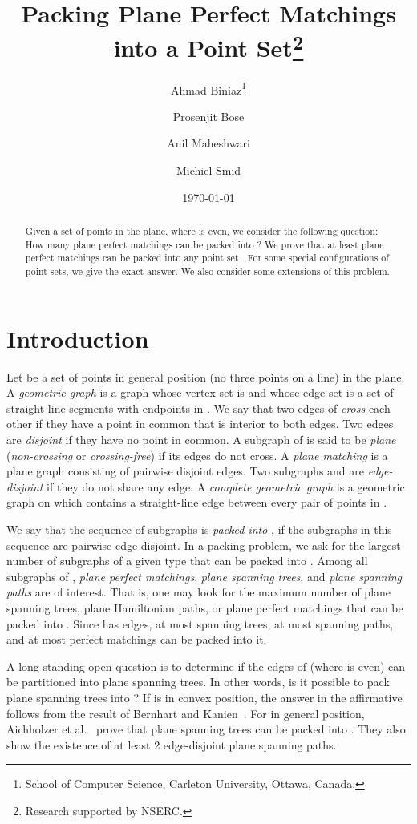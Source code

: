 \documentclass[11pt,a4paper]{article}
\title{Packing Plane Perfect Matchings into a Point Set\thanks{Research supported by NSERC.}}
\author{
Ahmad Biniaz\thanks{School of Computer Science, Carleton University, 
                    Ottawa, Canada.}
\and 
Prosenjit Bose\footnotemark[2]
\and
Anil Maheshwari\footnotemark[2]
\and 
Michiel Smid\footnotemark[2]
}\date{\today}
\begin{document}
\maketitle

\begin{abstract}
Given a set  of  points in the plane, where  is even, we consider the following question: How many plane perfect matchings can be packed into ? We prove that at least  plane perfect matchings can be packed into any point set . For some special configurations of point sets, we give the exact answer. We also consider some extensions of this problem.
\end{abstract}
\section{Introduction}
\label{introduction-section}
Let  be a set of  points in general position (no three points on a line) in the plane. A {\em geometric graph}  is a graph whose vertex set is  and whose edge set  is a set of straight-line segments with endpoints in . We say that two edges of  {\em cross} each other if they have a point in common that is interior to both edges. Two edges are {\em disjoint} if they have no point in common. A subgraph  of  is said to be {\em plane} ({\em non-crossing} or {\em crossing-free}) if its edges do not cross. A {\em plane matching} is a plane graph consisting of pairwise disjoint edges. Two subgraphs  and  are {\em edge-disjoint} if they do not share any edge. A {\em complete geometric graph}  is a geometric graph on  which contains a straight-line edge between every pair of points in . 

We say that the sequence  of subgraphs is {\em packed into} , if the subgraphs in this sequence are pairwise edge-disjoint. In a packing problem, we ask for the largest number of subgraphs of a given type that can be packed into . Among all subgraphs of , {\em plane perfect matchings}, {\em plane spanning trees}, and {\em plane spanning paths} are of interest. That is, one may look for the maximum number of plane spanning trees, plane Hamiltonian paths, or plane perfect matchings that can be packed into . Since  has  edges, at most  spanning trees, at most  spanning paths, and at most  perfect matchings can be packed into it. 

A long-standing open question is to determine if the edges of  (where  is even) can be partitioned into  plane spanning trees. In other words, is it possible to pack  plane spanning trees into ? If  is in convex position, the answer in the affirmative follows from the result of Bernhart and Kanien~\cite{Bernhart1979}. For  in general position, Aichholzer et al.~\cite{Aichholzer2014} prove that  plane spanning trees can be packed into . They also show the existence of at least 2 edge-disjoint plane spanning paths. 
\end{document}
